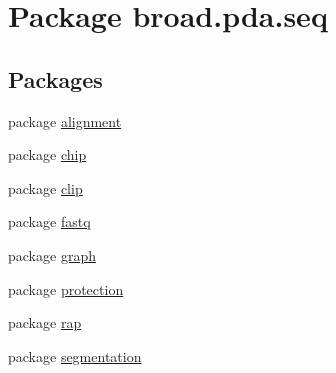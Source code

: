 \hypertarget{namespacebroad_1_1pda_1_1seq}{\section{Package broad.\+pda.\+seq}
\label{namespacebroad_1_1pda_1_1seq}
}
\subsection*{Packages}
\begin{DoxyCompactItemize}
\item 
package \hyperlink{namespacebroad_1_1pda_1_1seq_1_1alignment}{alignment}
\item 
package \hyperlink{namespacebroad_1_1pda_1_1seq_1_1chip}{chip}
\item 
package \hyperlink{namespacebroad_1_1pda_1_1seq_1_1clip}{clip}
\item 
package \hyperlink{namespacebroad_1_1pda_1_1seq_1_1fastq}{fastq}
\item 
package \hyperlink{namespacebroad_1_1pda_1_1seq_1_1graph}{graph}
\item 
package \hyperlink{namespacebroad_1_1pda_1_1seq_1_1protection}{protection}
\item 
package \hyperlink{namespacebroad_1_1pda_1_1seq_1_1rap}{rap}
\item 
package \hyperlink{namespacebroad_1_1pda_1_1seq_1_1segmentation}{segmentation}
\end{DoxyCompactItemize}
